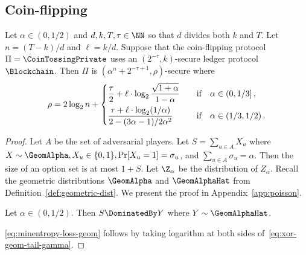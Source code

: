 \subsection{Coin-flipping}
\begin{proposition}\label{prop:coin-tossing-security-private-geom}
    Let $\alpha \in (0, 1/2)$ and $d, k, T, \tau \in \NN$ 
    so that $d$ divides both $k$ and $T$. 
    Let $n = (T - k)/d$ and $\ell = k/d$. 
    Suppose that the coin-flipping protocol $\Pi = \CoinTossingPrivate$ 
    uses an $(2^{-\tau}, k)$-secure ledger protocol $\Blockchain$.
    Then $\Pi$ is 
    $(\alpha^n + 2^{-\tau + 1}, \rho)$-secure 
    where
   \begin{equation}
      \label{eq:minentropy-loss-geom}
      \rho = 2 \log_2 n + \begin{dcases}
       \frac{\tau}{2} +
          \ell \cdot \log_2\frac{\sqrt{1+\alpha}}{1 - \alpha}              
           &\quad\text{if}\quad\alpha \in (0, 1/3]\,, \\
          \frac{\tau + \ell \cdot \log_2 (1/\alpha)}{2 - (3\alpha - 1)/2\alpha^2}
           &\quad\text{if}\quad\alpha \in (1/3, 1/2)\,.
       \end{dcases}
   \end{equation}
\end{proposition}
\begin{proof}
    Let $A$ be the set of adversarial players. 
    Let $S = \sum_{u \in A}X_u$ 
    where $X \sim \GeomAlpha, X_u \in \{0,1\}, \Pr[X_u = 1] = \sigma_u$, and 
    $\sum_{u \in A} \sigma_u = \alpha$. 
    Then the size of an option set is at most $1 + S$. 
    Let $\Z_\alpha$ be the distribution of $Z_\alpha$. 
    Recall the geometric distributions $\GeomAlpha$ and $\GeomAlphaHat$ 
    from Definition~\ref{def:geometric-dist}.
    We present the proof in Appendix~\ref{app:poisson}. 
    \begin{lemma}\label{lemma:geom-dominates-poisson}
       Let $\alpha \in (0, 1/2)$. 
       Then $S \DominatedBy Y$ where $Y \sim \GeomAlphaHat$. 
    \end{lemma} 
    \eqref{eq:minentropy-loss-geom} follows by taking 
    logarithm at both sides of~\eqref{eq:xor-geom-tail-gamma}.
\end{proof}


